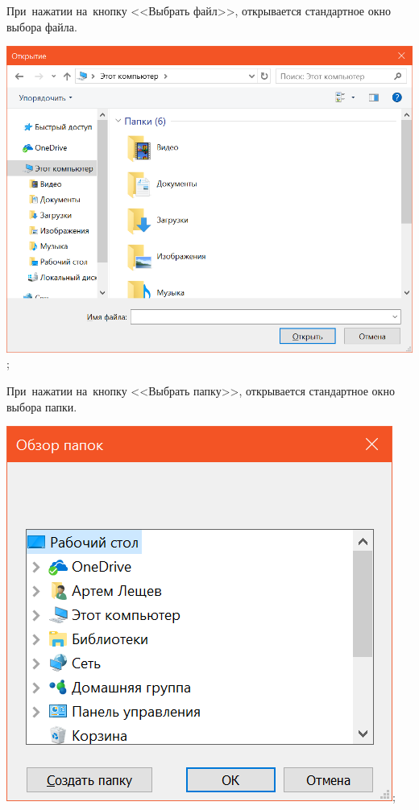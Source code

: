 \documentclass[a4paper,12pt]{article}
\begin{document}
При~нажатии на~кнопку <<Выбрать файл>>, открывается стандартное окно выбора файла.
\begin{center}
\includegraphics[width=\linewidth]{file.png};
\end{center}

При~нажатии на~кнопку <<Выбрать папку>>, открывается стандартное окно выбора папки.
\begin{center}
\includegraphics{folder.png};
\end{center}
\end{document}

